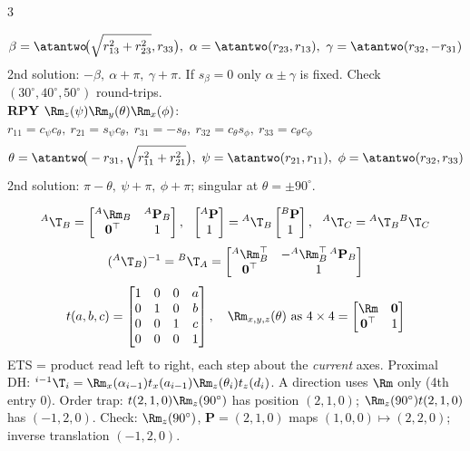 \begin{multicols}{3}
\begin{fbx}[Rodrigues; angles from $\Rm$ ($r_{ij}$ = row $i$, col $j$) \pg{W3 38}]
\[\beta=\atantwo\!\big(\sqrt{r_{13}^2+r_{23}^2},r_{33}\big),\ \alpha=\atantwo(r_{23},r_{13}),\ \gamma=\atantwo(r_{32},-r_{31})\]
2nd solution: $-\beta,\ \alpha+\pi,\ \gamma+\pi$. If $s_\beta=0$ only $\alpha\pm\gamma$ is fixed. Check $(30^\circ,40^\circ,50^\circ)$ round-trips. \chk\\
\textbf{RPY} $\Rm_z(\psi)\Rm_y(\theta)\Rm_x(\phi)$: $r_{11}=c_\psi c_\theta,\ r_{21}=s_\psi c_\theta,\ r_{31}=-s_\theta,\ r_{32}=c_\theta s_\phi,\ r_{33}=c_\theta c_\phi$
\[\theta=\atantwo\!\big(-r_{31},\sqrt{r_{11}^2+r_{21}^2}\big),\ \psi=\atantwo(r_{21},r_{11}),\ \phi=\atantwo(r_{32},r_{33})\]
2nd solution: $\pi-\theta,\ \psi+\pi,\ \phi+\pi$; singular at $\theta=\pm90^\circ$.
\end{fbx}
\begin{fbx}
\[{}^A\T_B=\begin{bmatrix}{}^A\Rm_B&{}^A\mathbf P_B\\\mathbf 0^\top&1\end{bmatrix},\ \ \begin{bmatrix}{}^A\mathbf P\\1\end{bmatrix}={}^A\T_B\begin{bmatrix}{}^B\mathbf P\\1\end{bmatrix},\ \ {}^A\T_C={}^A\T_B{}^B\T_C\]
\[({}^A\T_B)^{-1}={}^B\T_A=\begin{bmatrix}{}^A\Rm_B^\top&-{}^A\Rm_B^\top\,{}^A\mathbf P_B\\\mathbf 0^\top&1\end{bmatrix}\]
\[t(a,b,c)=\begin{bmatrix}1&0&0&a\\0&1&0&b\\0&0&1&c\\0&0&0&1\end{bmatrix},\quad\Rm_{x,y,z}(\theta)\text{ as }4\times4=\begin{bmatrix}\Rm&\mathbf 0\\\mathbf 0^\top&1\end{bmatrix}\]
ETS = product read left to right, each step about the \emph{current} axes. Proximal DH: ${}^{i-1}\T_i=\Rm_x(\alpha_{i-1})t_x(a_{i-1})\Rm_z(\theta_i)t_z(d_i)$. A direction uses $\Rm$ only (4th entry 0). Order trap: $t(2,1,0)\Rm_z(90^\circ)$ has position $(2,1,0)$; $\Rm_z(90^\circ)t(2,1,0)$ has $(-1,2,0)$. Check: $\Rm_z(90^\circ)$, $\mathbf P=(2,1,0)$ maps $(1,0,0)\mapsto(2,2,0)$; inverse translation $(-1,2,0)$. \chk
\end{fbx}


\end{multicols}
